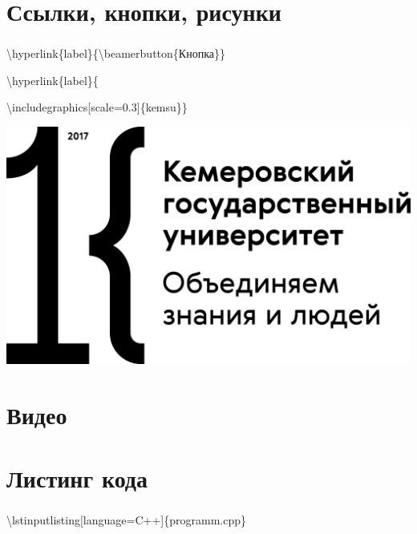 \documentclass[russian, 14pt]{beamer}
\newcommand{\cm}[1]{{\color{Mycolor3}\textbackslash#1}}
\begin{document}
\section{Ссылки, кнопки, рисунки}

\begin{frame} \label{button}
	\frametitle{\insertsection}
	\begin{block}{}
		\cm{hyperlink}\{label\}\{\cm{beamerbutton}\{Кнопка\}\}
		
		
		\cm{hyperlink}\{label\}\{
		
		\cm{includegraphics}[scale=0.3]\{kemsu\}\}
	\end{block}
	
	
	\centering\hyperlink{video}{\includegraphics[scale=0.3]{kemsu}}
\end{frame}

\section{Видео}

\begin{frame} \label{video}
	\frametitle{\insertsection}
\end{frame}

\section{Листинг кода}

\begin{frame}
	\frametitle{\insertsection}
	\begin{block}{}
		\cm{lstinputlisting}[language=C++]\{programm.cpp\}
	\end{block}
	
\end{frame}
\end{document}
